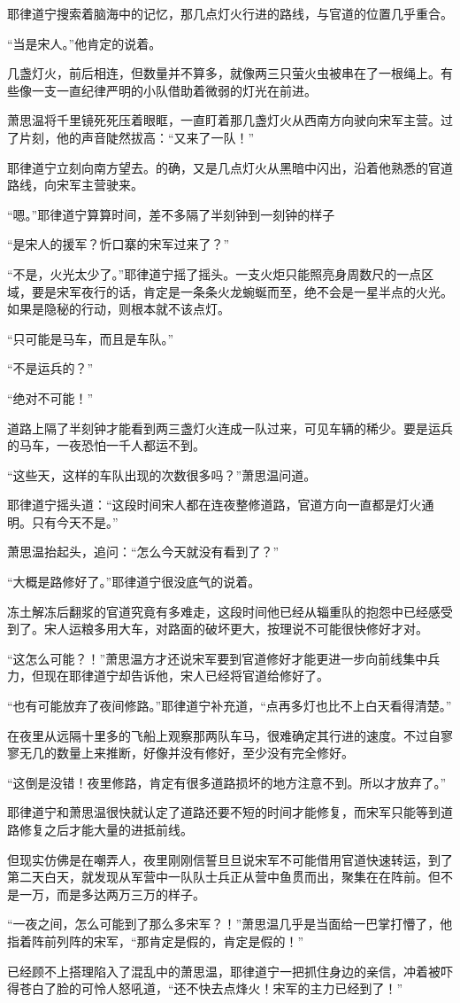 耶律道宁搜索着脑海中的记忆，那几点灯火行进的路线，与官道的位置几乎重合。

“当是宋人。”他肯定的说着。

几盏灯火，前后相连，但数量并不算多，就像两三只萤火虫被串在了一根绳上。有些像一支一直纪律严明的小队借助着微弱的灯光在前进。

萧思温将千里镜死死压着眼眶，一直盯着那几盏灯火从西南方向驶向宋军主营。过了片刻，他的声音陡然拔高：“又来了一队！”

耶律道宁立刻向南方望去。的确，又是几点灯火从黑暗中闪出，沿着他熟悉的官道路线，向宋军主营驶来。

“嗯。”耶律道宁算算时间，差不多隔了半刻钟到一刻钟的样子

“是宋人的援军？忻口寨的宋军过来了？”

“不是，火光太少了。”耶律道宁摇了摇头。一支火炬只能照亮身周数尺的一点区域，要是宋军夜行的话，肯定是一条条火龙蜿蜒而至，绝不会是一星半点的火光。如果是隐秘的行动，则根本就不该点灯。

“只可能是马车，而且是车队。”

“不是运兵的？”

“绝对不可能！”

道路上隔了半刻钟才能看到两三盏灯火连成一队过来，可见车辆的稀少。要是运兵的马车，一夜恐怕一千人都运不到。

“这些天，这样的车队出现的次数很多吗？”萧思温问道。

耶律道宁摇头道：“这段时间宋人都在连夜整修道路，官道方向一直都是灯火通明。只有今天不是。”

萧思温抬起头，追问：“怎么今天就没有看到了？”

“大概是路修好了。”耶律道宁很没底气的说着。

冻土解冻后翻浆的官道究竟有多难走，这段时间他已经从辎重队的抱怨中已经感受到了。宋人运粮多用大车，对路面的破坏更大，按理说不可能很快修好才对。

“这怎么可能？！”萧思温方才还说宋军要到官道修好才能更进一步向前线集中兵力，但现在耶律道宁却告诉他，宋人已经将官道给修好了。

“也有可能放弃了夜间修路。”耶律道宁补充道，“点再多灯也比不上白天看得清楚。”

在夜里从远隔十里多的飞船上观察那两队车马，很难确定其行进的速度。不过自寥寥无几的数量上来推断，好像并没有修好，至少没有完全修好。

“这倒是没错！夜里修路，肯定有很多道路损坏的地方注意不到。所以才放弃了。”

耶律道宁和萧思温很快就认定了道路还要不短的时间才能修复，而宋军只能等到道路修复之后才能大量的进抵前线。

但现实仿佛是在嘲弄人，夜里刚刚信誓旦旦说宋军不可能借用官道快速转运，到了第二天白天，就发现从军营中一队队士兵正从营中鱼贯而出，聚集在在阵前。但不是一万，而是多达两万三万的样子。

“一夜之间，怎么可能到了那么多宋军？！”萧思温几乎是当面给一巴掌打懵了，他指着阵前列阵的宋军，“那肯定是假的，肯定是假的！”

已经顾不上搭理陷入了混乱中的萧思温，耶律道宁一把抓住身边的亲信，冲着被吓得苍白了脸的可怜人怒吼道，“还不快去点烽火！宋军的主力已经到了！”
